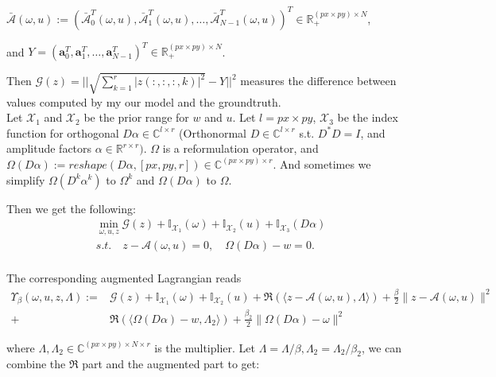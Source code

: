 \documentclass{article}
\numberwithin{equation}{section}
\begin{document}
 $\bar{\mathcal{A}}(\omega, u):=\left(\bar{\mathcal{A}}_{0}^{T}(\omega, u), \bar{\mathcal{A}}_{1}^{T}(\omega, u), \ldots,\bar{\mathcal{A}}_{N-1}^{T}(\omega, u)\right)^{T} 
\in \mathbb{R}_+^{(px\times py) \times N}$,
 

 
and $Y=\left(\boldsymbol{a}_{0}^{T}, \boldsymbol{a}_{1}^{T}, \ldots, \boldsymbol{a}_{N-1}^{T}\right)^{T} \in \mathbb{R}_{+}^{(px \times py) \times N }$.




 Then $\mathcal{G}(z)= || \sqrt{ \sum_{k=1}^{r} |z(:,:,:,k)|^2} - Y||^2$ measures the difference between values computed by my our model and the groundtruth. \\
 Let $\mathcal{X}_{1}$ and $\mathcal{X}_{2}$ be the prior range for $w$ and $u$. Let  $l=px \times py$, $\mathcal{X}_{3}$ be the index function for orthogonal $D\alpha \in \mathbb{C}^{l \times r}$ (Orthonormal $D \in  \mathbb{C}^{l \times r}$ s.t. $D^*D=I$, and amplitude factors $\alpha \in  \mathbb{R}^{r \times r})$.
 $\Omega$ is a reformulation operator, and $\Omega(D\alpha) := reshape(D\alpha,[px,py,r]) \in \mathbb{C}^{(px \times py) \times r}$. And sometimes we simplify $\Omega(D^k\alpha^k)$ to $\Omega^k$ and $\Omega(D\alpha)$ to $\Omega$.
 
  Then we get the following:
\begin{equation}
\begin{aligned}
&\min _{\omega, u, z} \mathcal{G}(z)+\mathbb{I}_{\mathcal{X}_{1}}(\omega)+\mathbb{I}_{\mathcal{X}_{2}}(u)
+ \mathbb{I}_{\mathcal{X}_{3}}(D\alpha) \\
 &s.t. \quad z-\mathcal{A}(\omega, u)=0, \quad \Omega(D\alpha) - w = 0. \\
\end{aligned}
\end{equation}

The corresponding augmented Lagrangian reads
$$
\begin{aligned}
\Upsilon_{\beta}(\omega, u, z, \Lambda):=&\mathcal{G}(z)+\mathbb{I}_{\mathcal{X}_{1}}(\omega)+\mathbb{I}_{\mathcal{X}_{2}}(u)+\Re(\langle z-\mathcal{A}(\omega, u), \Lambda\rangle)+\frac{\beta}{2}\|z-\mathcal{A}(\omega, u)\|^{2}
\\
+&\Re(\langle \Omega(D\alpha) - w, \Lambda_2\rangle)+\frac{\beta_2}{2}\| \Omega(D\alpha) - \omega\|^{2}
\end{aligned}
$$

where $\Lambda,\Lambda_2 \in \mathbb{C}^{(px \times py) \times N \times r}$ is the multiplier.
Let $\Lambda = \Lambda / \beta, \Lambda_2 = \Lambda_2 / \beta_2$, we can combine the $\Re$ part and the augmented part to get:
\end{document}
